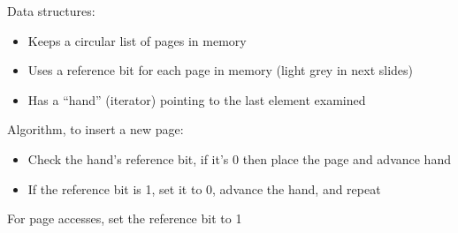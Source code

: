 \begin{slide}


    Data structures:
    \begin{itemize}
      \item Keeps a circular list of pages in memory
      \item Uses a reference bit for each page in memory (light grey in next slides)
      \item Has a ``hand'' (iterator) pointing to the last element examined
    \end{itemize}
    \medskip

    Algorithm, to insert a new page:
    \begin{itemize}
      \item Check the hand's reference bit, if it's 0 then place the page and advance hand
      \item If the reference bit is 1, set it to 0, advance the hand, and repeat
    \end{itemize}
    \medskip

    For page accesses, set the reference bit to 1

\end{slide}

